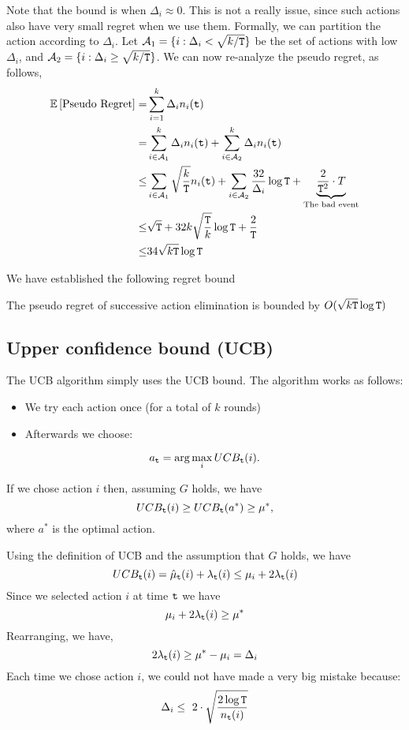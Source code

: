 Note that the bound is  when $\Delta_i\approx 0$. This is not a really issue, since such actions also have very small regret when we use them. Formally, we can partition the action according to $\Delta_i$. Let $\mathcal{A}_1=\{i:\Delta_i< \sqrt{k/{\tt T}}\}$ be the set of actions with low $\Delta_i$, and $\mathcal{A}_2=\{i:\Delta_i\geq \sqrt{k/{\tt T}}\}$. We can now re-analyze the pseudo regret, as follows,
\begin{align*}
\mathbb{E}\left[\text{Pseudo Regret}\right]  = &  \sum_{i=1}^{k}\Delta_{i}n_{i}({\tt t})\\
= &  \sum_{i\in \mathcal{A}_1}^{k}\Delta_{i}n_{i}({\tt t})+ \sum_{i\in \mathcal{A}_2}^{k}\Delta_{i}n_{i}({\tt t})\\
  \le & \sum_{i\in\mathcal{A}_1}\sqrt{\frac{k}{{\tt T}}}n_{i}({\tt t}) +\sum_{i\in\mathcal{A}_2}\frac{32}{\Delta_{i}}\log {\tt T}
  +\underbrace{\frac{2}{{\tt T}^{2}}\cdot T}_{\text{The bad event}}\\
  \leq & \sqrt{{\tt T}}+ 32 k \sqrt{\frac{{\tt T}}{k}}\log{\tt T}+ \frac{2}{{\tt T}}\\
  \leq & 34  \sqrt{k{\tt T}}\log{\tt T}
\end{align*}

We have established the following regret bound

\begin{theorem}
\label{thm:MAB:SE2}
The pseudo regret of successive action elimination is bounded by $O( \sqrt{k{\tt T}}\log{\tt T})$
\end{theorem}


\subsection{Upper confidence bound (UCB)}

The UCB algorithm simply uses the UCB bound. The algorithm works as
follows:
\begin{itemize}
\item We try each action once (for a total of $k$ rounds)
\item Afterwards we choose:
\end{itemize}
\[
a_{{\tt t}}=\arg\max_{i}UCB_{{\tt t}}(i).
\]

If we chose action $i$ then, assuming $G$ holds, we have
\[
UCB_{{\tt t}}(i)  \ge  UCB_{{\tt t}}(a^*)\geq\mu^{*},
\]
where $a^*$ is the optimal action.

Using the definition of UCB and the assumption that $G$ holds, we
have
\[
UCB_{{\tt t}}(i)=\hat{\mu}_{{\tt t}}(i)+\lambda_{{\tt t}}(i)\le\mu_{i}+2\lambda_{{\tt t}}(i)
\]
Since we selected action $i$ at time ${\tt t}$ we have
\[
\mu_{i}+2\lambda_{{\tt t}}(i)\ge\mu^{*}
\]
Rearranging, we have,
\[
2\lambda_{{\tt t}}(i)\ge\mu^{*}-\mu_{i}=\Delta_{i}
\]
Each time we chose action $i$, we could not have made a very big
mistake because:
\[
\Delta_{i}\leq\text{ }2\cdot\sqrt{\frac{2\log {\tt T}}{n_{{\tt t}}(i)}}
\]

